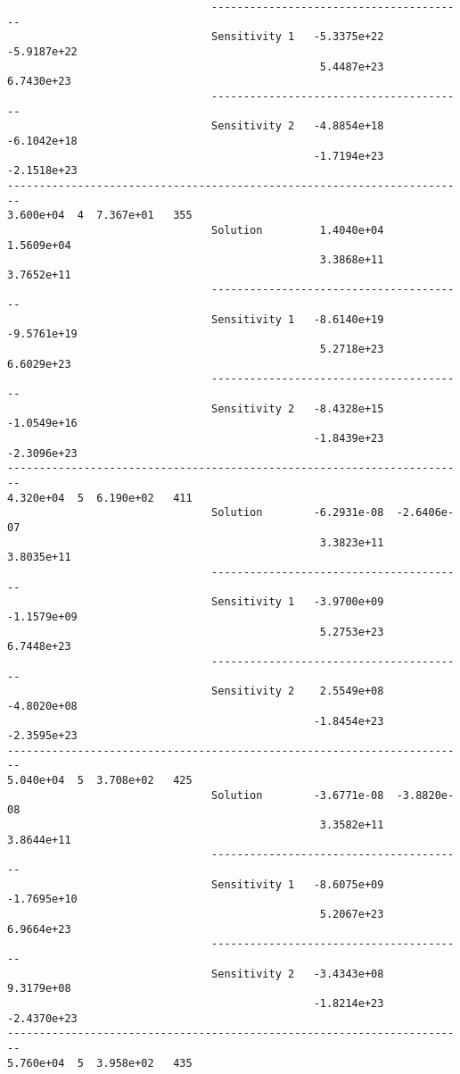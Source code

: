 \begin{verbatim}
                                ----------------------------------------
                                Sensitivity 1   -5.3375e+22  -5.9187e+22 
                                                 5.4487e+23   6.7430e+23 
                                ----------------------------------------
                                Sensitivity 2   -4.8854e+18  -6.1042e+18 
                                                -1.7194e+23  -2.1518e+23 
------------------------------------------------------------------------
3.600e+04  4  7.367e+01   355
                                Solution         1.4040e+04   1.5609e+04 
                                                 3.3868e+11   3.7652e+11 
                                ----------------------------------------
                                Sensitivity 1   -8.6140e+19  -9.5761e+19 
                                                 5.2718e+23   6.6029e+23 
                                ----------------------------------------
                                Sensitivity 2   -8.4328e+15  -1.0549e+16 
                                                -1.8439e+23  -2.3096e+23 
------------------------------------------------------------------------
4.320e+04  5  6.190e+02   411
                                Solution        -6.2931e-08  -2.6406e-07 
                                                 3.3823e+11   3.8035e+11 
                                ----------------------------------------
                                Sensitivity 1   -3.9700e+09  -1.1579e+09 
                                                 5.2753e+23   6.7448e+23 
                                ----------------------------------------
                                Sensitivity 2    2.5549e+08  -4.8020e+08 
                                                -1.8454e+23  -2.3595e+23 
------------------------------------------------------------------------
5.040e+04  5  3.708e+02   425
                                Solution        -3.6771e-08  -3.8820e-08 
                                                 3.3582e+11   3.8644e+11 
                                ----------------------------------------
                                Sensitivity 1   -8.6075e+09  -1.7695e+10 
                                                 5.2067e+23   6.9664e+23 
                                ----------------------------------------
                                Sensitivity 2   -3.4343e+08   9.3179e+08 
                                                -1.8214e+23  -2.4370e+23 
------------------------------------------------------------------------
5.760e+04  5  3.958e+02   435

\end{verbatim}
